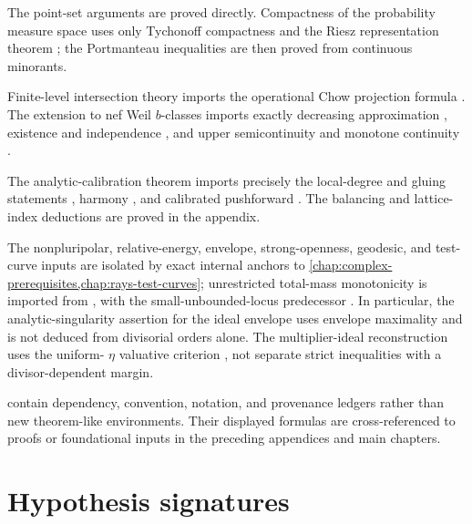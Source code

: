 \begin{description}[style=nextline,leftmargin=1.5em,labelindent=0pt]
\item[\Cref{app:nets}.]
The point-set arguments are proved directly.  Compactness of the probability
measure space uses only Tychonoff compactness
\cite[Chapter~5]{Kel75} and the Riesz representation theorem
\cite[Theorem~2.14]{Rud87}; the Portmanteau inequalities are then proved
from continuous minorants.

\item[\Cref{app:intersection-bdivisors}.]
Finite-level intersection theory imports the operational Chow projection
formula \cite[Proposition~2.3(c)]{Ful}.  The extension to nef Weil
\(b\)-classes imports exactly decreasing approximation
\cite[Theorem~2.1]{DF20}, existence and independence
\cite[Proposition--Definition~3.1]{DF20}, and upper semicontinuity and
monotone continuity \cite[Theorem~3.2]{DF20}.

\item[\Cref{app:tropical-algebra}.]
The analytic-calibration theorem imports precisely the local-degree and
gluing statements
\cite[Proposition~14.3.1, \S14.3.2, Lemma~14.3.4, and
Definition~14.3.5]{CLD25}, harmony
\cite[Theorem~15.6.1]{CLD25}, and calibrated pushforward
\cite[Proposition~14.4.2]{CLD25}.  The balancing and lattice-index
deductions are proved in the appendix.

\item[\Cref{app:complex-reference}.]
The nonpluripolar, relative-energy, envelope, strong-openness, geodesic, and
test-curve inputs are isolated by exact internal anchors to
\cref{chap:complex-prerequisites,chap:rays-test-curves}; unrestricted
total-mass monotonicity is imported from
\cite[Theorem~1.1]{DDNL18mono}, with the small-unbounded-locus predecessor
\cite[Theorem~1.16]{BEGZ10}.  In particular,
the analytic-singularity assertion for the ideal envelope uses envelope
maximality and is not deduced from divisorial orders alone.
The multiplier-ideal reconstruction uses the uniform-
\(\eta\) valuative criterion \cite[Corollary~10.18]{Bou17}, not separate
strict inequalities with a divisor-dependent margin.
\end{description}

 contain
dependency, convention, notation, and provenance ledgers rather than new
theorem-like environments.  Their displayed formulas are cross-referenced
to proofs or foundational inputs in the preceding appendices and main
chapters.

\section{Hypothesis signatures}
\label{sec:appL-signatures}

